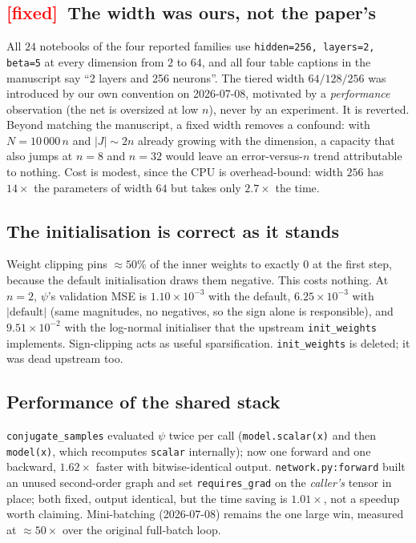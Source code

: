 \documentclass[11pt]{article}
\newcommand{\file}[1]{\texttt{#1}}
\newcommand{\abs}[1]{\left\vert #1 \right\vert}
\newcommand{\MUST}{\textcolor{red}{\textbf{[fixed]}}}
\begin{document}
\subsection{\MUST\ The width was ours, not the paper's}
\label{sec:width}

All $24$ notebooks of the four reported families use
\texttt{hidden=256, layers=2, beta=5} at every dimension from $2$ to $64$, and
all four table captions in the manuscript say ``2 layers and 256 neurons''. The
tiered width $64/128/256$ was introduced by our own convention on 2026-07-08,
motivated by a \emph{performance} observation (the net is oversized at low $n$),
never by an experiment. It is reverted. Beyond matching the manuscript, a fixed
width removes a confound: with $N=10\,000\,n$ and $\abs{J}\sim2n$ already growing
with the dimension, a capacity that also jumps at $n=8$ and $n=32$ would leave an
error-versus-$n$ trend attributable to nothing. Cost is modest, since the CPU is
overhead-bound: width $256$ has $14\times$ the parameters of width $64$ but takes
only $2.7\times$ the time.

\subsection{The initialisation is correct as it stands}
\label{sec:init}

Weight clipping pins $\approx50\%$ of the inner weights to exactly $0$ at the
first step, because the default initialisation draws them negative. This costs
nothing. At $n=2$, $\psi$'s validation MSE is $1.10\times10^{-3}$ with the
default, $6.25\times10^{-3}$ with $\abs{\text{default}}$ (same magnitudes, no
negatives, so the sign alone is responsible), and $9.51\times10^{-2}$ with the
log-normal initialiser that the upstream \texttt{init\_weights} implements.
Sign-clipping acts as useful sparsification. \texttt{init\_weights} is deleted;
it was dead upstream too.

\subsection{Performance of the shared stack}

\file{conjugate\_samples} evaluated $\psi$ twice per call
(\texttt{model.scalar(x)} and then \texttt{model(x)}, which recomputes
\texttt{scalar} internally); now one forward and one backward, $1.62\times$
faster with bitwise-identical output. \file{network.py:forward} built an unused
second-order graph and set \texttt{requires\_grad} on the \emph{caller's} tensor
in place; both fixed, output identical, but the time saving is $1.01\times$, not
a speedup worth claiming. Mini-batching (2026-07-08) remains the one large win,
measured at $\approx50\times$ over the original full-batch loop.
\end{document}
